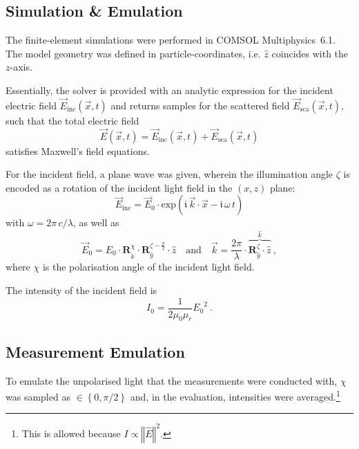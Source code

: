 \documentclass[10pt]{article}
\begin{document}
\begin{multicols}{2}
\section*{Simulation \& Emulation}

The finite-element simulations were performed in COMSOL \mbox{Multiphysics 6.1}. 
The model geometry was defined in particle-coordinates, i.e. $\hat{z}$ coincides with the $z$-axis. \cite{BA} 

Essentially, the solver is provided with an analytic expression for the incident electric field
$\vec{E}_\mathrm{inc}(\vec{x},t)$
and returns samples for the scattered field
$\vec{E}_\mathrm{sca}(\vec{x},t)$, 
such that the total electric field 
$$\vec{E}(\vec{x},t) = \vec{E}_\mathrm{inc}(\vec{x},t) + \vec{E}_\mathrm{sca}(\vec{x},t) $$
satisfies Maxwell's field equations. 

For the incident field, a plane wave was given, wherein the illumination angle $\zeta$ is encoded as a rotation of the incident light field in the $(x,z)$ plane: 
$$
    \vec{E}_\mathrm{inc} = \vec{E}_0 \cdot \mathrm{exp}\left( \mathfrak{i} \, \vec{k} \cdot \vec{x} - \mathfrak{i} \, \omega \, t \right)
$$
with $\omega = 2\pi\,c/\lambda$, as well as
$$
    \vec{E}_0 = E_0 \cdot \boldsymbol{R}_{\hat{k}}^{\chi} \cdot \boldsymbol{R}_{\hat{y}}^{\zeta-\frac{\pi}{2}} \cdot \hat{z}
    \quad\text{and}\quad
    \vec{k} = \frac{2\pi}{\lambda} \cdot \overbrace{ \boldsymbol{R}_{\hat{y}}^{\zeta} \cdot \hat{z} }^{\hat{k}}
    \ ,
$$
where $\chi$ is the polarisation angle of the incident light field. %

The intensity of the incident field is 
$$I_0 = \frac{1}{2\mu_0 \mu_r} {E_0}^2 \ .$$
\cite{Griffiths-ED,MA}



\subsection*{Measurement Emulation}

To emulate the unpolarised light that the measurements were conducted with, $\chi$ was sampled as \mbox{$\in\left\lbrace0, \pi/2\right\rbrace$} and, in the evaluation, intensities were averaged.\footnote{This is allowed because $I\propto\left\Vert \hat{E} \right\Vert^2$.}


\end{multicols}
\end{document}
